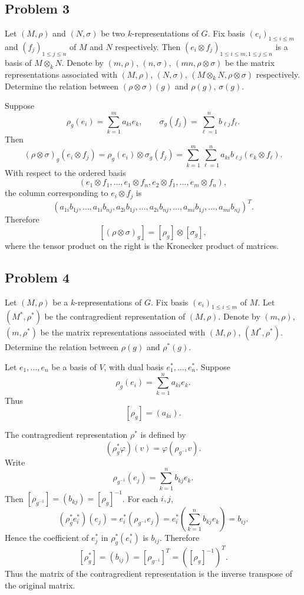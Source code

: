 \subsection*{Problem 3}
Let $(M, \rho)$ and $(N, \sigma)$ be two $k$-representations of $G$. Fix basis $(e_i)_{1 \le i \le m}$ and $(f_j)_{1 \le j \le n}$ of $M$ and $N$ respectively. Then $(e_i \otimes f_j)_{1 \le i \le m, 1 \le j \le n}$ is a basis of $M \otimes_k N$. Denote by $(m, \rho)$, $(n, \sigma)$, $(mn, \rho \otimes \sigma)$ be the matrix representations associated with $(M, \rho)$, $(N, \sigma)$, $(M \otimes_k N, \rho \otimes \sigma)$ respectively.
Determine the relation between $(\rho \otimes \sigma)(g)$ and $\rho(g)$, $\sigma(g)$.
\begin{solution}
    Suppose
\[
\rho_g(e_i)=\sum_{k=1}^m a_{ki}e_k,
\qquad
\sigma_g(f_j)=\sum_{\ell=1}^n b_{\ell j}f_\ell .
\]
Then
\[
(\rho\otimes\sigma)_g(e_i\otimes f_j)
=
\rho_g(e_i)\otimes\sigma_g(f_j)
=
\sum_{k=1}^m\sum_{\ell=1}^n
a_{ki}b_{\ell j}(e_k\otimes f_\ell).
\]
With respect to the ordered basis
\[
(e_1\otimes f_1,\ldots,e_1\otimes f_n,
e_2\otimes f_1,\ldots,e_m\otimes f_n),
\]
the column corresponding to \(e_i\otimes f_j\) is
\[
(a_{1i}b_{1j},\ldots,a_{1i}b_{nj},
a_{2i}b_{1j},\ldots,a_{2i}b_{nj},
\ldots,
a_{mi}b_{1j},\ldots,a_{mi}b_{nj})^T.
\]
Therefore
\[
[(\rho\otimes\sigma)_g]=[\rho_g]\otimes[\sigma_g],
\]
where the tensor product on the right is the Kronecker product of matrices.
\end{solution}



\subsection*{Problem 4}
Let $(M, \rho)$ be a $k$-representations of $G$. Fix basis $(e_i)_{1 \le i \le m}$ of $M$. Let $(M^*, \rho^*)$ be the contragredient representation of $(M, \rho)$. Denote by $(m, \rho)$, $(m, \rho^*)$ be the matrix representations associated with $(M, \rho)$, $(M^*, \rho^*)$.
Determine the relation between $\rho(g)$ and $\rho^*(g)$.

\begin{solution}
Let \(e_1,\dots,e_n\) be a basis of \(V\), with dual basis
\(e_1^*,\dots,e_n^*\). Suppose
\[
\rho_g(e_i)=\sum_{k=1}^n a_{ki}e_k.
\]
Thus
\[
[\rho_g]=(a_{ki}).
\]

The contragredient representation \(\rho^*\) is defined by
\[
(\rho_g^*\varphi)(v)=\varphi(\rho_{g^{-1}}v).
\]
Write
\[
\rho_{g^{-1}}(e_j)=\sum_{k=1}^n b_{kj}e_k.
\]
Then \([\rho_{g^{-1}}]=(b_{kj})=[\rho_g]^{-1}\). For each \(i,j\),
\[
(\rho_g^*e_i^*)(e_j)
=
e_i^*(\rho_{g^{-1}}e_j)
=
e_i^*\left(\sum_{k=1}^n b_{kj}e_k\right)
=
b_{ij}.
\]
Hence the coefficient of \(e_j^*\) in \(\rho_g^*(e_i^*)\) is \(b_{ij}\). Therefore
\[
[\rho_g^*]=(b_{ij})= [\rho_{g^{-1}}]^T=([\rho_g]^{-1})^T.
\]
Thus the matrix of the contragredient representation is the inverse transpose
of the original matrix.
\end{solution}


